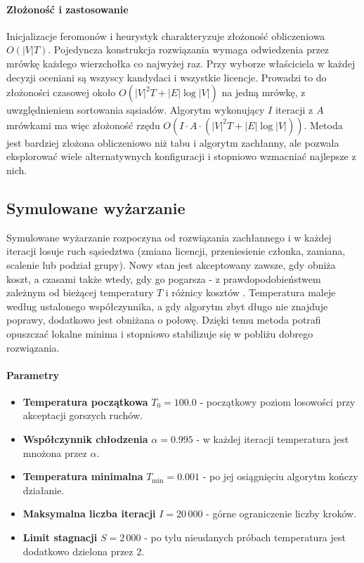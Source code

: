 \paragraph{Złożoność i zastosowanie}
Inicjalizacje feromonów i heurystyk charakteryzuje złożoność obliczeniowa $O(|V|T)$. Pojedyncza konstrukcja rozwiązania wymaga odwiedzenia przez mrówkę każdego wierzchołka co najwyżej raz. Przy wyborze właściciela w każdej decyzji oceniani są wszyscy kandydaci i wszystkie licencje. Prowadzi to do złożoności czasowej około $O(|V|^2 T + |E|\log |V|)$ na jedną mrówkę, z uwzględnieniem sortowania sąsiadów. Algorytm wykonujący $I$ iteracji z $A$ mrówkami ma więc złożoność rzędu $O\!\left(I \cdot A \cdot (|V|^2 T + |E|\log |V|)\right)$. Metoda jest bardziej złożona obliczeniowo niż tabu i algorytm zachłanny, ale pozwala eksplorować wiele alternatywnych konfiguracji i stopniowo wzmacniać najlepsze z nich.


\subsection{Symulowane wyżarzanie }\label{subsec:sa}
Symulowane wyżarzanie rozpoczyna od rozwiązania zachłannego i w każdej iteracji losuje ruch sąsiedztwa (zmiana licencji, przeniesienie członka, zamiana, scalenie lub podział grupy). Nowy stan jest akceptowany zawsze, gdy obniża koszt, a czasami także wtedy, gdy go pogarsza - z prawdopodobieństwem zależnym od bieżącej temperatury \(T\) i różnicy kosztów \cite{kirkpatrick1983}. Temperatura maleje według ustalonego współczynnika, a gdy algorytm zbyt długo nie znajduje poprawy, dodatkowo jest obniżana o połowę. Dzięki temu metoda potrafi opuszczać lokalne minima i stopniowo stabilizuje się w pobliżu dobrego rozwiązania.

\paragraph{Parametry}
\begin{itemize}
  \item \textbf{Temperatura początkowa} $T_0 = 100.0$ - początkowy poziom losowości przy akceptacji gorszych ruchów.
  \item \textbf{Współczynnik chłodzenia} $\alpha = 0.995$ - w każdej iteracji temperatura jest mnożona przez $\alpha$.
  \item \textbf{Temperatura minimalna} $T_{\min} = 0.001$ - po jej osiągnięciu algorytm kończy działanie.
  \item \textbf{Maksymalna liczba iteracji} $I = 20\,000$ - górne ograniczenie liczby kroków.
  \item \textbf{Limit stagnacji} $S = 2\,000$ - po tylu nieudanych próbach temperatura jest dodatkowo dzielona przez 2.
\end{itemize}

